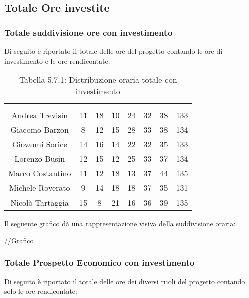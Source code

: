 \subsection{Totale Ore investite}

\subsubsection{Totale suddivisione ore con investimento}
Di seguito è riportato il totale delle ore del progetto contando le ore di investimento e le ore rendicontate:

\renewcommand{\arraystretch}{1.5}
\begin{table}[H]
\begin{center}
\begin{tabular}{|c|c|c|c|c|c|c|c|}
\hline
\rowcolor{title_row}
\textbf{\color{title_text}{Nome}} & \textbf{\color{title_text}{Resp.}} & \textbf{\color{title_text}{Ammi.}} & \textbf{\color{title_text}{Analist.}} & \textbf{\color{title_text}{Progett.}} & \textbf{\color{title_text}{Program.}} & \textbf{\color{title_text}{Verific.}} & \textbf{\color{title_text}{Totale}} \\ \hline
Andrea Trevisin  & 11 & 18 & 10 & 24 & 32 & 38 & 133 \\ \hline
Giacomo Barzon   & 8 & 12 & 15 & 28 & 33 & 38 & 134 \\ \hline
Giovanni Sorice  & 14 & 16 & 14 & 22 & 32 & 35 & 133 \\ \hline
Lorenzo Busin    & 12 & 15 & 12 & 25 & 33 & 37 & 134 \\ \hline
Marco Costantino & 11 & 12 & 18 & 13 & 37 & 44 & 135 \\ \hline
Michele Roverato & 9 & 14 & 18 & 18 & 37 & 35 & 131 \\ \hline
Nicolò Tartaggia & 15 & 8 & 21 & 16 & 36 & 39 & 135  \\ \hline
\end{tabular}
\caption{Tabella 5.7.1: Distribuzione oraria totale con investimento\label{}}
\end{center}
\end{table}
\renewcommand{\arraystretch}{1}

Il seguente grafico dà una rappresentazione visiva della suddivisione oraria: \\
\begin{center}
//Grafico
\end{center}

\subsubsection{Totale Prospetto Economico con investimento}
Di seguito è riportato il totale delle ore dei diversi ruoli del progetto contando solo le ore rendicontate:

